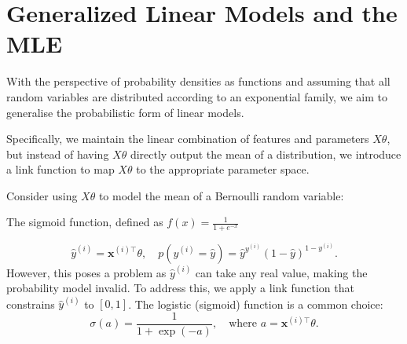 \section{Generalized Linear Models and the MLE}

With the perspective of probability densities as functions and assuming that all random variables are distributed according to an exponential family, we aim to generalise the probabilistic form of linear models.

\bigskip
Specifically, we maintain the linear combination of features and parameters \( X\theta \), but instead of having \( X\theta \) directly output the mean of a distribution, we introduce a link function to map \( X\theta \) to the appropriate parameter space.


Consider using \( X\theta \) to model the mean of a Bernoulli random variable:
\begin{marginfigure}
    \centering
    \caption{The sigmoid function, defined as \( f(x) = \frac{1}{1 + e^{-x}} \)}
    \label{fig:sigmoid}
\end{marginfigure}




\[
    \hat{y}^{(i)} = \boldsymbol{x}^{(i)\top}\theta, \quad p(y^{(i)} = \hat{y}) = \hat{y}^{y^{(i)}} (1 - \hat{y})^{1 - y^{(i)}}.
\]
However, this poses a problem as \( \hat{y}^{(i)} \) can take any real value, making the probability model invalid. To address this, we apply a link function that constrains \( \hat{y}^{(i)} \) to \([0,1]\). The logistic (sigmoid) function is a common choice:
\[
    \sigma(a) = \frac{1}{1 + \exp(-a)}, \quad \text{where } a = \boldsymbol{x}^{(i)\top}\theta.
\]

